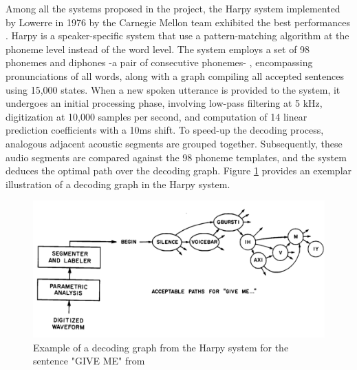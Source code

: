 Among all the systems proposed in the project, the Harpy system implemented by Lowerre in 1976 by the Carnegie Mellon team exhibited the best performances \cite{klatt1977review}. Harpy is a speaker-specific system that use a pattern-matching algorithm at the phoneme level instead of the word level. The system employs a set of 98 phonemes and diphones -a pair of consecutive phonemes- , encompassing pronunciations of all words, along with a graph compiling all accepted sentences using 15,000 states. When a new spoken utterance is provided to the system, it undergoes an initial processing phase, involving low-pass filtering at 5 kHz, digitization at 10,000 samples per second, and computation of 14 linear prediction coefficients with a 10ms shift. To speed-up the decoding process, analogous adjacent acoustic segments are grouped together. Subsequently, these audio segments are compared against the 98 phoneme templates, and the system deduces the optimal path over the decoding graph. Figure \ref{harpy} provides an exemplar illustration of a decoding graph in the Harpy system.



\begin{figure}[h]
\includegraphics[width=\textwidth]{imgs/harpy.png}
\caption{Example of a decoding graph from the Harpy system for the sentence "GIVE ME" from \cite{klatt1977review}}
\label{harpy}
\end{figure}

